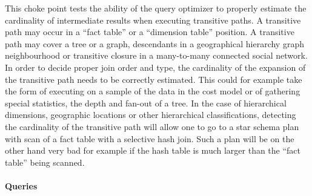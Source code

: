 
This choke point tests the ability of the query optimizer to properly estimate
the cardinality of intermediate results when executing transitive paths. A
transitive path may occur in a ``fact table'' or a ``dimension table'' position.
A transitive path may cover a tree or a graph, \eg descendants in a geographical
hierarchy \vs graph neighbourhood or transitive closure in a many-to-many
connected social network. In order to decide proper join order and type, the
cardinality of the expansion of the transitive path needs to be correctly
estimated. This could for example take the form of executing on a sample of the
data in the cost model or of gathering special statistics, \eg the depth and
fan-out of a tree. In the case of hierarchical dimensions, \eg geographic
locations or other hierarchical classifications, detecting the cardinality of
the transitive path will allow one to go to a star schema plan with scan of a
fact table with a selective hash join. Such a plan will be on the other hand
very bad for example if the hash table is much larger than the ``fact table''
being scanned.


\paragraph{Queries}
{\raggedright
}